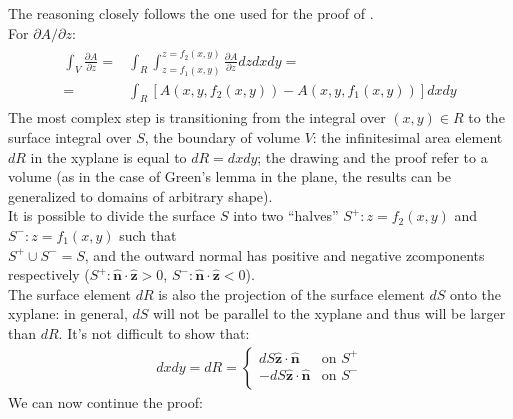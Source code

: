 \documentclass[letterpaper,10pt,english]{jupyterBook}
\begin{document}
\sphinxAtStartPar
The reasoning closely follows the one used for the proof of {\hyperref[\detokenize{ch/multivariable/intro:multivariable-calculus-green-lemma}]{}}.\\
For \({\partial A}/{\partial z}\):
\begin{equation*}
\begin{split}\begin{aligned}
\int_V \frac{\partial A}{\partial z} = &
\int_R \int_{z = f_1(x,y)}^{z = f_2(x,y)} \frac{\partial A}{\partial z} dz dx dy = \\
= & \int_R [A(x,y,f_2(x,y)) - A(x,y,f_1(x,y))] dx dy
\end{aligned}
\end{split}
\end{equation*}
\sphinxAtStartPar
The most complex step is transitioning from the integral over \((x,y) \in R\) to the surface integral over \(S\), the boundary of volume \(V\): the infinitesimal area element \(dR\) in the xy\sphinxhyphen{}plane is equal to \(dR = dx dy\); the drawing and the proof refer to a  volume (as in the case of Green’s lemma in the plane, the results can be generalized to domains of arbitrary shape).\\
It is possible to divide the surface \(S\) into two “halves” \(S^+: z = f_2(x,y)\) and \(S^-: z = f_1(x,y)\) such that\\
\(S^+ \cup S^- = S\), and the outward normal has positive and negative z\sphinxhyphen{}components respectively (\(S^+: \mathbf{\hat{n}}\cdot\mathbf{\hat{z}}>0\), \(S^-: \mathbf{\hat{n}} \cdot\mathbf{\hat{z}}<0\)).\\
The surface element \(dR\) is also the projection of the surface element \(dS\) onto the xy\sphinxhyphen{}plane: in general, \(dS\) will not be parallel to the xy\sphinxhyphen{}plane and thus will be larger than \(dR\). It’s not difficult to show that:
\begin{equation*}
\begin{split}
 dx dy = dR =
 \begin{cases}
   dS \mathbf{\hat{z}} \cdot \mathbf{\hat{n}}  & \text{on $S^+$} \\
  - dS \mathbf{\hat{z}} \cdot \mathbf{\hat{n}}  & \text{on $S^-$} \\
 \end{cases}
\end{split}
\end{equation*}
\sphinxAtStartPar
We can now continue the proof:
\end{document}
